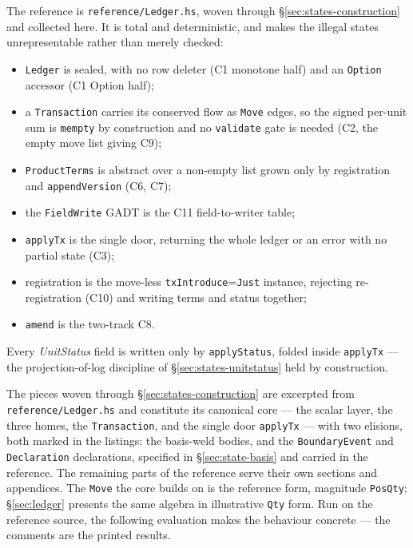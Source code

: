 \documentclass[11pt,a4paper]{article}
\begin{document}
The reference is \texttt{reference/Ledger.hs}, woven through \S\ref{sec:states-construction} and
collected here. It is total and deterministic, and makes the illegal states unrepresentable
rather than merely checked:
\begin{itemize}[nosep]
\item \texttt{Ledger} is sealed, with no row deleter (C1 monotone half) and an
\texttt{Option} accessor (C1 Option half);
\item a \texttt{Transaction} carries its conserved flow as \texttt{Move} edges, so the
signed per-unit sum is \texttt{mempty} by construction and no \texttt{validate} gate is
needed (C2, the empty move list giving C9);
\item \texttt{ProductTerms} is abstract over a non-empty list grown only by registration
and \texttt{appendVersion} (C6, C7);
\item the \texttt{FieldWrite} GADT is the C11 field-to-writer table;
\item \texttt{applyTx} is the single door, returning the whole ledger or an error with no
partial state (C3);
\item registration is the move-less \texttt{txIntroduce}=\texttt{Just} instance, rejecting
re-registration (C10) and writing terms and status together;
\item \texttt{amend} is the two-track C8.
\end{itemize}
Every \emph{UnitStatus} field is written only by \texttt{applyStatus}, folded inside
\texttt{applyTx} --- the projection-of-log discipline of \S\ref{sec:states-unitstatus} held
by construction.

The pieces woven through \S\ref{sec:states-construction} are excerpted from
\texttt{reference/Ledger.hs} and constitute its canonical core --- the scalar layer, the
three homes, the \texttt{Transaction}, and the single door \texttt{applyTx} --- with two
elisions, both marked in the listings: the basis-weld bodies, and the
\texttt{BoundaryEvent} and \texttt{Declaration} declarations, specified in
\S\ref{sec:state-basis} and carried in the reference. The remaining parts of the
reference serve their own sections and appendices. The \texttt{Move} the core builds on
is the reference form, magnitude \texttt{PosQty}; \S\ref{sec:ledger} presents the same
algebra in illustrative \texttt{Qty} form. Run on the reference source, the
following evaluation makes the behaviour concrete --- the comments are the printed results.
\end{document}
